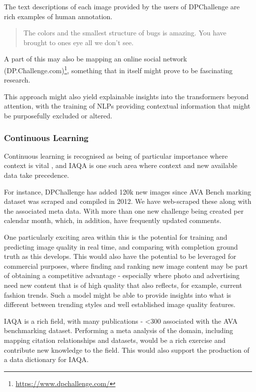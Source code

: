 The text descriptions of each image provided by the users of DPChallenge are rich examples of human annotation. 
\begin{quote}
The colors and the smallest structure of bugs is amazing. You have brought to ones eye all we don't see.\cite{Brendel2021}
\end{quote}
A part of this may also be mapping an online social network (DP.Challenge.com)\footnote{\href{https://www.dpchallenge.com/}{https://www.dpchallenge.com/}}, something that in itself might prove to be fascinating research. 


This approach might also yield explainable insights into the transformers beyond attention\cite{Chefer2020}, with the training of NLPs providing contextual information that might be purposefully excluded or altered. 


\subsubsection{Continuous Learning}
\label{sec:continuous learning}

Continuous learning is recognised as being of particular importance where context is vital \cite{Chen2016, Lomonaco2020}, and IAQA is one such area where context and new available data take precedence.

For instance, DPChallenge has added 120k new images since AVA Bench marking dataset was scraped and compiled in 2012. We have web-scraped these along with the associated meta data. With more than one new challenge being created per calendar month, which, in addition, have frequently updated comments.

One particularly exciting area within this is the potential for training and predicting image quality in real time, and comparing with completion ground truth as this develops. This would also have the potential to be leveraged for commercial purposes, where finding and ranking new image content may be part of obtaining a competitive advantage - especially where photo and advertising need new content that is of high quality that also reflects, for example, current fashion trends. Such a model might be able to provide insights into what is different between trending styles and well established image quality features. 

IAQA is a rich field, with many publications - <300 associated with the AVA benchmarking dataset. Performing a meta analysis of the domain, including mapping citation relationships and datasets, would be a rich exercise and contribute new knowledge to the field. This would also support the production of a data dictionary for IAQA. 

